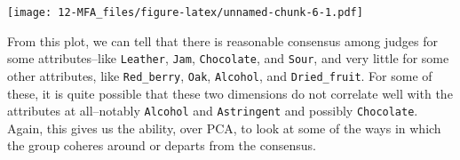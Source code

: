 \documentclass[
]{book}
\newenvironment{Shaded}{\begin{snugshade}}{\end{snugshade}}
\newcommand{\AttributeTok}[1]{\textcolor[rgb]{0.13,0.29,0.53}{#1}}
\newcommand{\DecValTok}[1]{\textcolor[rgb]{0.00,0.00,0.81}{#1}}
\newcommand{\FunctionTok}[1]{\textcolor[rgb]{0.13,0.29,0.53}{\textbf{#1}}}
\newcommand{\NormalTok}[1]{#1}
\newcommand{\SpecialCharTok}[1]{\textcolor[rgb]{0.81,0.36,0.00}{\textbf{#1}}}
\newcommand{\StringTok}[1]{\textcolor[rgb]{0.31,0.60,0.02}{#1}}
\begin{document}
\begin{Shaded}
\end{Shaded}

\texttt{[image: 12-MFA\_files/figure-latex/unnamed-chunk-6-1.pdf]}

From this plot, we can tell that there is reasonable consensus among judges for some attributes--like \texttt{Leather}, \texttt{Jam}, \texttt{Chocolate}, and \texttt{Sour}, and very little for some other attributes, like \texttt{Red\_berry}, \texttt{Oak}, \texttt{Alcohol}, and \texttt{Dried\_fruit}. For some of these, it is quite possible that these two dimensions do not correlate well with the attributes at all--notably \texttt{Alcohol} and \texttt{Astringent} and possibly \texttt{Chocolate}. Again, this gives us the ability, over PCA, to look at some of the ways in which the group coheres around or departs from the consensus.
\end{document}
